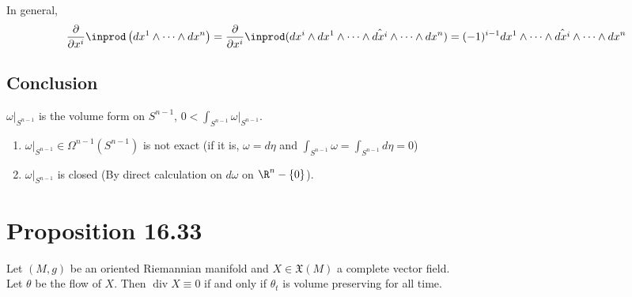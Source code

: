 \documentclass[11pt]{article}
\begin{document}
In general,\\
\begin{align*}
  \frac{\partial}{\partial x^{i}}\inprod\left( dx^{1}\wedge\cdots\wedge dx^{n} \right)
  =\frac{\partial}{\partial x^{i}}\inprod(dx^{i}\wedge dx^{1}\wedge \cdots\wedge\hat{dx^{i}}\wedge\cdots\wedge dx^{n})
  =(-1)^{i-1}dx^{1}\wedge\cdots\wedge\hat{dx^{i}}\wedge\cdots\wedge dx^{n}
\end{align*}
\subsection*{Conclusion}
\label{sec:org4e65cac}
\(\omega|_{S^{n-1}}\) is the volume form on \(S^{n-1}\), \(0<\int_{S^{n-1}}\omega|_{S^{n-1}}\).\\
\begin{enumerate}
\item \(\omega|_{S^{n-1}}\in\Omega^{n-1}(S^{n-1})\) is not exact (if it is, \(\omega= d\eta\) and \(\int_{S^{n-1}}\omega=\int_{S^{n-1}}d\eta=0\))\\
\item \(\omega|_{S^{n-1}}\) is closed (By direct calculation on \(d\omega\) on \(\R^{n}-\{0\}\)).\\
\end{enumerate}
\section*{Proposition 16.33}
\label{sec:org62e492e}
Let \((M,g)\) be an oriented Riemannian manifold and \(X\in\mathfrak{X}(M)\) a complete vector field.\\
Let \(\theta\) be the flow of \(X\). Then \(\operatorname{div} X\equiv 0\) if and only if \(\theta_{t}\) is volume preserving for all time.\\
\end{document}
